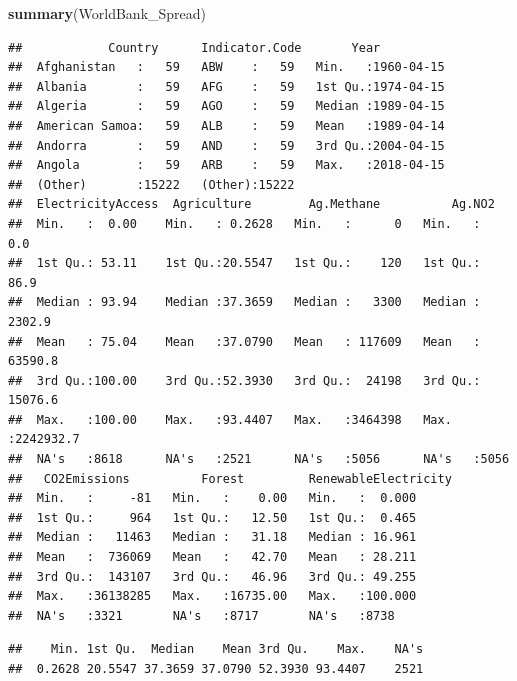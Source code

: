 \documentclass[12pt,]{article}
\newenvironment{Shaded}{\begin{snugshade}}{\end{snugshade}}
\newcommand{\KeywordTok}[1]{\textcolor[rgb]{0.13,0.29,0.53}{\textbf{#1}}}
\newcommand{\OperatorTok}[1]{\textcolor[rgb]{0.81,0.36,0.00}{\textbf{#1}}}
\newcommand{\NormalTok}[1]{#1}
\begin{document}
\begin{Shaded}
\begin{Highlighting}[]
\KeywordTok{summary}\NormalTok{(WorldBank_Spread)}
\end{Highlighting}
\end{Shaded}

\begin{verbatim}
##            Country      Indicator.Code       Year           
##  Afghanistan   :   59   ABW    :   59   Min.   :1960-04-15  
##  Albania       :   59   AFG    :   59   1st Qu.:1974-04-15  
##  Algeria       :   59   AGO    :   59   Median :1989-04-15  
##  American Samoa:   59   ALB    :   59   Mean   :1989-04-14  
##  Andorra       :   59   AND    :   59   3rd Qu.:2004-04-15  
##  Angola        :   59   ARB    :   59   Max.   :2018-04-15  
##  (Other)       :15222   (Other):15222                       
##  ElectricityAccess  Agriculture        Ag.Methane          Ag.NO2         
##  Min.   :  0.00    Min.   : 0.2628   Min.   :      0   Min.   :      0.0  
##  1st Qu.: 53.11    1st Qu.:20.5547   1st Qu.:    120   1st Qu.:     86.9  
##  Median : 93.94    Median :37.3659   Median :   3300   Median :   2302.9  
##  Mean   : 75.04    Mean   :37.0790   Mean   : 117609   Mean   :  63590.8  
##  3rd Qu.:100.00    3rd Qu.:52.3930   3rd Qu.:  24198   3rd Qu.:  15076.6  
##  Max.   :100.00    Max.   :93.4407   Max.   :3464398   Max.   :2242932.7  
##  NA's   :8618      NA's   :2521      NA's   :5056      NA's   :5056       
##   CO2Emissions          Forest         RenewableElectricity
##  Min.   :     -81   Min.   :    0.00   Min.   :  0.000     
##  1st Qu.:     964   1st Qu.:   12.50   1st Qu.:  0.465     
##  Median :   11463   Median :   31.18   Median : 16.961     
##  Mean   :  736069   Mean   :   42.70   Mean   : 28.211     
##  3rd Qu.:  143107   3rd Qu.:   46.96   3rd Qu.: 49.255     
##  Max.   :36138285   Max.   :16735.00   Max.   :100.000     
##  NA's   :3321       NA's   :8717       NA's   :8738
\end{verbatim}

\begin{Shaded}
\end{Shaded}

\begin{verbatim}
##    Min. 1st Qu.  Median    Mean 3rd Qu.    Max.    NA's 
##  0.2628 20.5547 37.3659 37.0790 52.3930 93.4407    2521
\end{verbatim}
\end{document}
